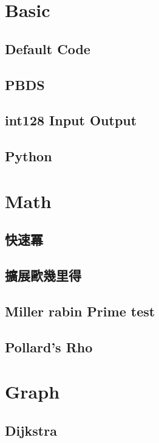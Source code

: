 \section{Basic}
\subsection{Default Code}

\subsection{PBDS}

\subsection{int128 Input Output}

\subsection{Python}


\section{Math}
\subsection{快速冪} 

\subsection{擴展歐幾里得} 

\subsection{Miller rabin Prime test} 

\subsection{Pollard's Rho} 


\section{Graph}
\subsection{Dijkstra} 


